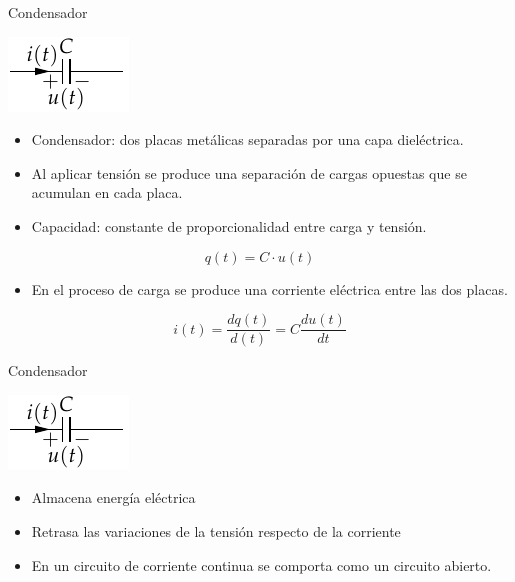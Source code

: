 \documentclass[xcolor={usenames,svgnames,dvipsnames}]{beamer}
\begin{document}
\begin{frame}[label={sec:org1ca74ed}]{Condensador}
\begin{center}
\includegraphics[height=0.2\textheight]{../figs/Condensador.pdf}
\end{center}

\begin{itemize}
\item \alert{Condensador}: dos placas metálicas separadas por una capa dieléctrica.

\item Al aplicar tensión se produce una \alert{separación de cargas opuestas que
se acumulan en cada placa}.

\item \alert{Capacidad}: constante de proporcionalidad entre carga y tensión.
\end{itemize}
\[
q(t) = C \cdot u(t)
\]

\begin{itemize}
\item En el proceso de carga se produce una corriente eléctrica entre las
dos placas.
\end{itemize}
\[
i(t)=\frac{dq(t)}{d(t)}=C\frac{du(t)}{dt}
\]
\end{frame}


\begin{frame}[label={sec:org7479238}]{Condensador}
\begin{center}
\includegraphics[height=0.2\textheight]{../figs/Condensador.pdf}
\end{center}

\begin{itemize}
\item Almacena \alert{energía eléctrica}

\item \alert{Retrasa las variaciones de la tensión respecto de la corriente}

\item En un circuito de corriente continua se comporta como un circuito
abierto.
\end{itemize}
\end{frame}
\end{document}
